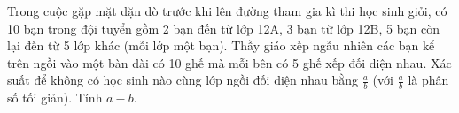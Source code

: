 \begin{question}[type=short_answer,difficulty=4,code={III-4}]
Trong cuộc gặp mặt dặn dò trước khi lên đường tham gia kì thi học sinh giỏi, có 10 bạn trong đội tuyển gồm 2 bạn đến từ lớp 12A, 3 bạn từ lớp 12B, 5 bạn còn lại đến từ 5 lớp khác (mỗi lớp một bạn). Thầy giáo xếp ngẫu nhiên các bạn kể trên ngồi vào một bàn dài có 10 ghế mà mỗi bên có 5 ghế xếp đối diện nhau. Xác suất để không có học sinh nào cùng lớp ngồi đối diện nhau bằng $ \frac{a}{b} $ (với $ \frac{a}{b} $ là phân số tối giản). Tính $ a-b $.


\end{question}